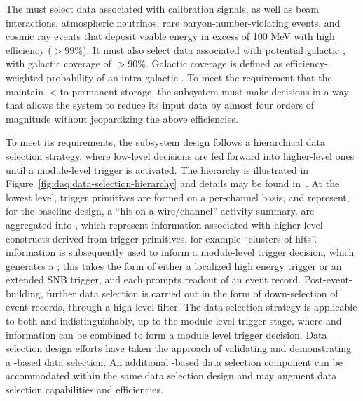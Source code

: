 The  must select data associated with calibration
signals, as well as beam interactions,
atmospheric neutrinos, rare baryon-number-violating events, and cosmic
ray events that deposit visible energy in excess of 100 MeV with high efficiency ($>$99\%). 
It must also select data associated with potential galactic , with galactic coverage
of $>$90\%. Galactic coverage is defined as efficiency-weighted probability of an intra-galactic . 
To meet the requirement that the   maintain
$<$\offsitepbpy to permanent storage, the 
subsystem must make  decisions in a way that allows the  
system to reduce its input data by almost four orders of magnitude
without jeopardizing the above efficiencies.

To meet its requirements, the  subsystem design follows a hierarchical data selection strategy, where low-level decisions are fed forward into higher-level ones until a module-level trigger is activated. 
The hierarchy is illustrated in Figure~\ref{fig:daq:data-selection-hierarchy} and details may be found in~.
At the lowest level, trigger primitives are formed on a per-channel basis, and represent, for the baseline design, a ``hit on a wire/channel'' activity summary. 
 are aggregated into , which represent information associated with higher-level constructs derived from trigger primitives, for example ``clusters of hits''. 
 information is subsequently used to inform a module-level trigger decision, which generates a ; this takes the form of either a localized high energy trigger or an extended SNB trigger, and each prompts readout of an event record. 
Post-event-building, further data selection is carried out in the form of down-selection of event records, through a high level filter. 
The data selection strategy is applicable to both  and  indistinguishably, up to the module level trigger stage, where  and  information can be combined to form a module level trigger decision. 
Data selection design efforts have taken the approach of validating and demonstrating a -based data selection.
An additional -based data selection component can be accommodated within the same data selection design and may augment data selection capabilities and efficiencies.

